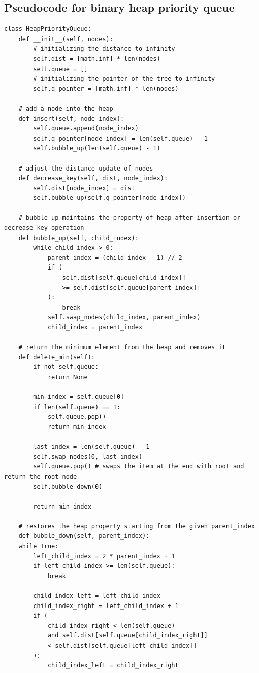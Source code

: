 \documentclass[12pt]{article}
\begin{document}
\subsection{Pseudocode for binary heap priority queue}
\begin{lstlisting}[style=mystyle]
    class HeapPriorityQueue:
    def __init__(self, nodes):
        # initializing the distance to infinity
        self.dist = [math.inf] * len(nodes)
        self.queue = []
        # initializing the pointer of the tree to infinity
        self.q_pointer = [math.inf] * len(nodes)

    # add a node into the heap
    def insert(self, node_index):
        self.queue.append(node_index)
        self.q_pointer[node_index] = len(self.queue) - 1
        self.bubble_up(len(self.queue) - 1)

    # adjust the distance update of nodes
    def decrease_key(self, dist, node_index):
        self.dist[node_index] = dist
        self.bubble_up(self.q_pointer[node_index])

    # bubble_up maintains the property of heap after insertion or decrease key operation
    def bubble_up(self, child_index):
        while child_index > 0:
            parent_index = (child_index - 1) // 2
            if (
                self.dist[self.queue[child_index]]
                >= self.dist[self.queue[parent_index]]
            ):
                break
            self.swap_nodes(child_index, parent_index)
            child_index = parent_index

    # return the minimum element from the heap and removes it
    def delete_min(self):
        if not self.queue:
            return None

        min_index = self.queue[0]
        if len(self.queue) == 1:
            self.queue.pop()
            return min_index

        last_index = len(self.queue) - 1
        self.swap_nodes(0, last_index)
        self.queue.pop() # swaps the item at the end with root and return the root node
        self.bubble_down(0)

        return min_index

    # restores the heap property starting from the given parent_index
    def bubble_down(self, parent_index):
    while True:
        left_child_index = 2 * parent_index + 1
        if left_child_index >= len(self.queue):
            break

        child_index_left = left_child_index
        child_index_right = left_child_index + 1
        if (
            child_index_right < len(self.queue)
            and self.dist[self.queue[child_index_right]]
            < self.dist[self.queue[left_child_index]]
        ):
            child_index_left = child_index_right


\end{lstlisting}
\end{document}
